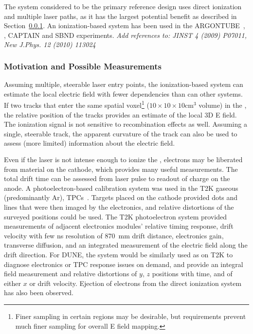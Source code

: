 The system considered to be the primary reference design 
 uses direct ionization and multiple laser paths, as it has the largest potential benefit as described in Section~\ref{sec:laser:motiv}. %
An ionization-based system has been used in the ARGONTUBE~\cite{Zeller:2013sva}, , CAPTAIN and SBND experiments.
{\it Add references to: JINST 4 (2009) P07011, New J.Phys. 12 (2010) 113024}

\subsubsection{Motivation and Possible Measurements}
\label{sec:laser:motiv}
Assuming  multiple, steerable laser entry points, the ionization-based system can estimate the local electric field with fewer dependencies than can other systems. If two tracks that enter the same spatial voxel\footnote{Finer sampling in certain regions may be desirable, but  requirements prevent much finer sampling for overall E field mapping.} ($10 \times 10 \times 10 \textrm{cm}^3$ volume) in the , the relative position of the tracks provides an estimate of the local 3D E field.  The ionization signal is not sensitive to recombination effects as well.  Assuming a single, steerable track, the apparent curvature of the track can also be used to assess (more limited) information about  the electric field. 

Even if the laser is not intense enough to ionize the , electrons may be liberated from material on the cathode, which provides many useful measurements. The total drift time can be  assessed from laser pulse to readout of charge on the anode.  A photoelectron-based calibration system was used in the T2K gaseous (predominantly Ar), TPCs~\cite{Abgrall:2010hi}. Targets placed on the cathode provided dots and lines that were then imaged by the electronics, and relative distortions of the surveyed positions could be used. The T2K photoelectron system provided measurements of adjacent electronics modules' relative timing response, drift velocity with few \si{\nano\s} resolution of \SI{870}{\milli\m} drift distance, electronics gain, transverse diffusion, and an integrated measurement of the electric field along the drift direction. For DUNE, the system would be similarly used as on T2K to diagnose electronics or TPC response issues on demand, and provide an integral field measurement and relative distortions of $y$, $z$ positions with time, and of either $x$ or drift velocity. Ejection of electrons from the direct ionization system has also been observed.

